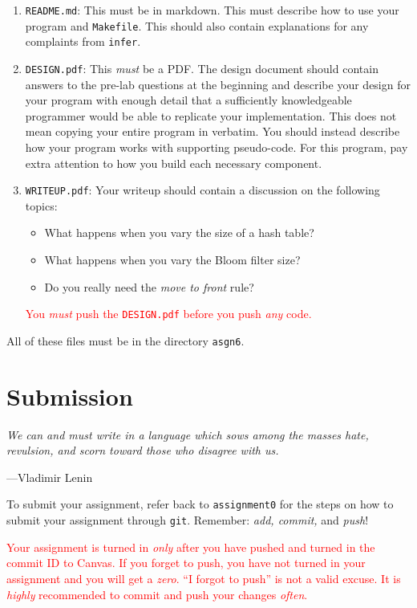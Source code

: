 \documentclass{article}
\begin{document}
\begin{enumerate}
\item \texttt{README.md}: This must be in markdown. This must describe how to
    use your program and \texttt{Makefile}. This should also contain
    explanations for any complaints from \texttt{infer}.

\item \texttt{DESIGN.pdf}: This \emph{must} be a PDF. The design document
    should contain answers to the pre-lab questions at the beginning and
    describe your design for your program with enough detail that a sufficiently
    knowledgeable programmer would be able to replicate your implementation.
    This does not mean copying your entire program in verbatim. You should
    instead describe how your program works with supporting pseudo-code. For
    this program, pay extra attention to how you build each necessary component.

\item \texttt{WRITEUP.pdf}: Your writeup should contain a discussion on the following topics:
\begin{itemize}
\item {What happens when you vary the size of a hash table?}
\item {What happens when you vary the Bloom filter size?}
\item {Do you really need the \textit{move to front} rule?}
\end{itemize}
    
    \textcolor{red}{You \emph{must} push the \texttt{DESIGN.pdf} before you push
    \emph{any} code.}
\end{enumerate}

All of these files must be in the directory \texttt{asgn6}.

\section{Submission}
\epigraph{\emph{We can and must write in a language which sows among the
masses hate, revulsion, and scorn toward those who disagree with
us.}}{---Vladimir Lenin}

\noindent
To submit your assignment, refer back to \texttt{assignment0} for
the steps on how to submit your assignment through \texttt{git}.
Remember: \emph{add, commit,} and \emph{push}!

\textcolor{red}{Your assignment is turned in \emph{only} after you
have pushed and turned in the commit ID to Canvas. If you forget to push,
you have not turned in your assignment and you will get a \emph{zero}.
``I forgot to push'' is not a valid excuse. It is \emph{highly} recommended
to commit and push your changes \emph{often}.}
\end{document}
